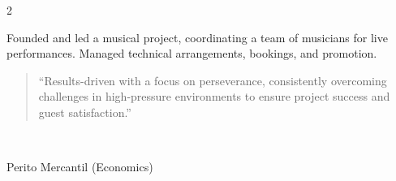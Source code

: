 \documentclass[10pt,a4paper,withhyper]{altacv}
\begin{document}
\begin{paracol}{2}
\divider

Founded and led a musical project, coordinating a team of musicians for live performances. Managed technical arrangements, bookings, and promotion.

\switchcolumn


\begin{quote}
``Results-driven with a focus on perseverance, consistently overcoming challenges in high-pressure environments to ensure project success and guest satisfaction.''
\end{quote}




\\


\divider
{}

\medskip


Perito Mercantil (Economics)

\divider


\end{paracol}
\end{document}

